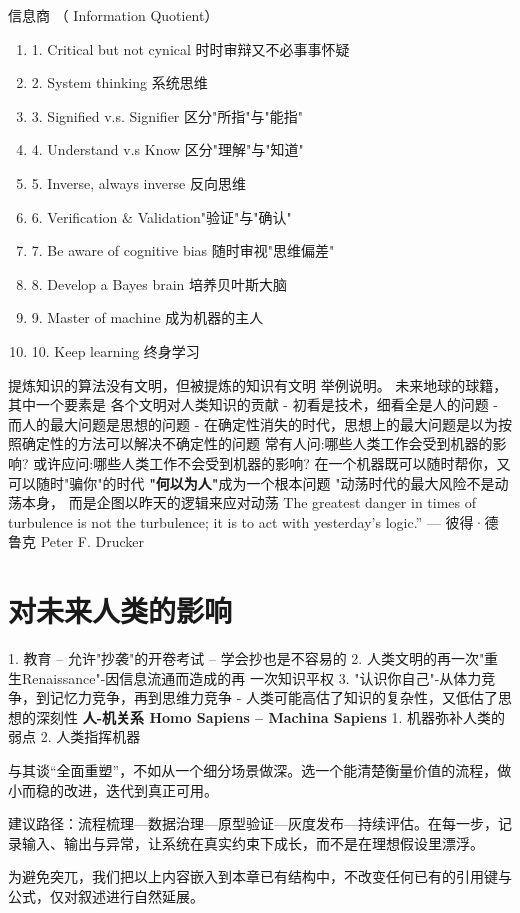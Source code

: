 信息商 （ Information Quotient）
\begin{enumerate}
\item 1. Critical but not cynical 时时审辩又不必事事怀疑
\item 2. System thinking 系统思维
\item 3. Signified v.s. Signifier 区分"所指"与"能指"
\item 4. Understand v.s Know 区分"理解"与"知道"
\item 5. Inverse, always inverse 反向思维
\item 6. Verification $\&$ Validation"验证"与"确认"
\item 7. Be aware of cognitive bias 随时审视"思维偏差"
\item 8. Develop a Bayes brain 培养贝叶斯大脑
\item 9. Master of machine 成为机器的主人
\item 10. Keep learning 终身学习
\end{enumerate}
提炼知识的算法没有文明，但被提炼的知识有文明
举例说明。
未来地球的球籍，其中一个要素是
  各个文明对人类知识的贡献
- 初看是技术，细看全是人的问题 - 而人的最大问题是思想的问题
- 在确定性消失的时代，思想上的最大问题是以为按照确定性的方法可以解决不确定性的问题
常有人问:哪些人类工作会受到机器的影响? 或许应问:哪些人类工作不会受到机器的影响?
在一个机器既可以随时帮你，又可以随时"骗你"的时代 {\bf "何以为人"}成为一个根本问题
"动荡时代的最大风险不是动荡本身， 而是企图以昨天的逻辑来应对动荡
The greatest danger in times of turbulence is not the turbulence; it is to act with yesterday’s logic.”
— 彼得·德鲁克 Peter F. Drucker
 \section{对未来人类的影响}
1. 教育 – 允许"抄袭"的开卷考试 – 学会抄也是不容易的
2. 人类文明的再一次"重生Renaissance"-因信息流通而造成的再 一次知识平权
3. "认识你自己"-从体力竞争，到记忆力竞争，再到思维力竞争 - 人类可能高估了知识的复杂性，又低估了思想的深刻性
{\bf 人-机关系 Homo Sapiens – Machina Sapiens}
1. 机器弥补人类的弱点
2. 人类指挥机器
\nocite{*}
\printbibliography[heading=bibintoc, title=\ebibname]
\newpage

与其谈“全面重塑”，不如从一个细分场景做深。选一个能清楚衡量价值的流程，做小而稳的改进，迭代到真正可用。

建议路径：流程梳理—数据治理—原型验证—灰度发布—持续评估。在每一步，记录输入、输出与异常，让系统在真实约束下成长，而不是在理想假设里漂浮。

为避免突兀，我们把以上内容嵌入到本章已有结构中，不改变任何已有的引用键与公式，仅对叙述进行自然延展。

